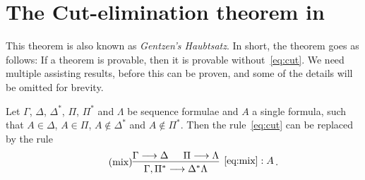 \documentclass[11pt,a4paper]{article}
\begin{document}
\section{\texorpdfstring{The Cut-elimination theorem in \LK}{The Cut-elimination theorem in LK}}

This theorem is also known as \emph{Gentzen's Haubtsatz}.
In short, the theorem goes as follows: If a theorem is provable,
then it is provable without~\eqref{eq:cut}.
We need multiple assisting results,
before this can be proven,
and some of the details will be omitted for brevity.

\begin{lemma}\label{lem:mix rule}
    Let \(\Gamma\), \(\Delta\), \(\Delta^\ast\), \(\Pi\), \(\Pi^\ast\) and \(\Lambda\) be sequence formulae
    and \(A\) a single formula, such that \(A\in\Delta\), \(A\in\Pi\),
    \(A\notin\Delta^\ast\) and \(A\notin\Pi^\ast\). Then the rule~\eqref{eq:cut}
    can be replaced by the rule
    \begin{equation}\label{eq:mix}\tag{mix}
        \begin{prooftree}
            \hypo{\Gamma\seq\Delta}
            \hypo{\Pi\seq\Lambda}
            \infer2[\(\eqref{eq:mix}:A\)]{\Gamma,\Pi^\ast\seq\Delta^\ast\Lambda}
        \end{prooftree}\,.
    \end{equation}
\end{lemma}
\end{document}

